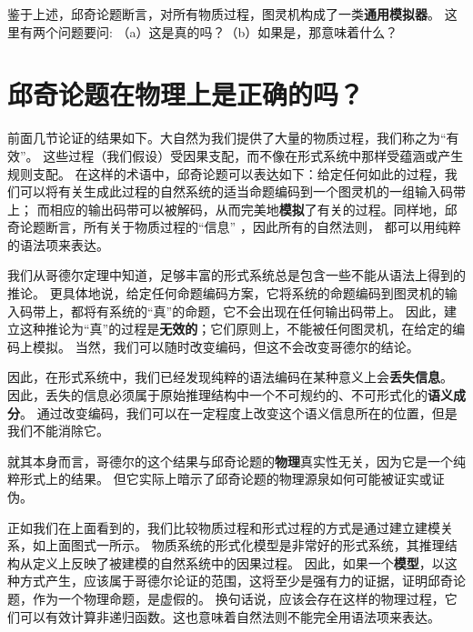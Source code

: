 \documentclass[a4paper,12pt]{article}
\begin{document}
鉴于上述，\gls{邱奇论题}断言，对所有\gls{物质过程}，\gls{图灵机}构成了一类\textbf{\gls{通用模拟器}}。 这里有两个问题要问: （a）这是真的吗？（b）如果是，那意味着什么？

\section{邱奇论题在物理上是正确的吗？}

前面几节论证的结果如下。大自然为我们提供了大量的\gls{物质过程}，我们称之为“有效”。
这些过程（我们假设）受\gls{因果}支配，而不像在\gls{形式系统}中那样受\gls{蕴涵}或\gls{产生规则}支配。
在这样的术语中，\gls{邱奇论题}可以表达如下：给定任何如此的过程，我们可以将有关\gls{生成}此过程的自然系统的适当\gls{命题}\gls{编码}到一个\gls{图灵机}的一组输入码带上；
而相应的输出码带可以被\gls{解码}，从而完美地\textbf{\gls{模拟}}了有关的过程。同样地，\gls{邱奇论题}断言，所有关于\gls{物质过程}的“信息” ，因此所有的\gls{自然法则}，
都可以用纯粹的\gls{语法项}来表达。

我们从哥德尔定理中知道，足够丰富的\gls{形式系统}总是包含一些不能从\gls{语法}上得到的推论。
更具体地说，给定任何\gls{命题}\gls{编码}方案，它将系统的\gls{命题}\gls{编码}到\gls{图灵机}的输入码带上，都将有系统的“真”的\gls{命题}，它不会出现在任何输出码带上。
因此，建立这种推论为“真”的过程是\textbf{无效的}；它们原则上，不能被任何\gls{图灵机}，在给定的编码上\gls{模拟}。
当然，我们可以随时改变\gls{编码}，但这不会改变哥德尔的结论。

因此，在\gls{形式系统}中，我们已经发现纯粹的\gls{语法编码}在某种意义上会\textbf{丢失信息}。
因此，丢失的信息必须属于原始\gls{推理结构}中一个不可规约的、不可\gls{形式化}的\textbf{\gls{语义成分}}。
通过改变\gls{编码}，我们可以在一定程度上改变这个\gls{语义信息}所在的位置，但是我们不能消除它。

就其本身而言，哥德尔的这个结果与\gls{邱奇论题}的\textbf{物理}真实性无关，因为它是一个纯粹形式上的结果。
但它实际上暗示了\gls{邱奇论题}的物理源泉如何可能被证实或证伪。

正如我们在上面看到的，我们比较\gls{物质过程}和\gls{形式过程}的方式是通过建立\gls{建模关系}，如上面图式一所示。
\gls{物质系统}的\gls{形式化}\gls{模型}是非常好的\gls{形式系统}，其\gls{推理结构}从定义上反映了被建模的自然系统中的\gls{因果过程}。
因此，如果一个\textbf{\gls{模型}}，以这种方式产生，应该属于哥德尔论证的范围，这将至少是强有力的证据，证明\gls{邱奇论题}，作为一个\gls{物理命题}，是虚假的。
换句话说，应该会存在这样的物理过程，它们可以有效计算非递归函数。这也意味着\gls{自然法则}不能完全用\gls{语法项}来表达。
\end{document}
